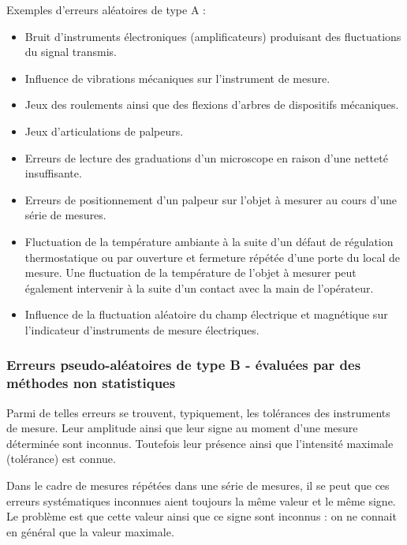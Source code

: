 Exemples d'erreurs aléatoires de type A :
\begin{itemize}

    \item Bruit d'instruments électroniques (amplificateurs) produisant des fluctuations du signal transmis.
    \item Influence de vibrations mécaniques sur l'instrument de mesure.
    \item Jeux des roulements ainsi que des flexions d'arbres de dispositifs mécaniques.
    \item Jeux d'articulations de palpeurs.
    \item Erreurs de lecture des graduations d'un microscope en raison d'une netteté insuffisante.
    \item Erreurs de positionnement d'un palpeur sur l'objet à mesurer au cours d'une série de mesures.
    \item Fluctuation de la température ambiante à la suite d'un défaut de régulation thermostatique ou par ouverture et fermeture répétée d'une porte du local de mesure. Une fluctuation de la température de l'objet à mesurer peut également intervenir à la suite d'un contact avec la main de l'opérateur.
    \item Influence de la fluctuation aléatoire du champ électrique et magnétique sur l'indicateur d'instruments de mesure électriques.
\end{itemize}

\subsubsection{Erreurs pseudo-aléatoires de type B - évaluées par des méthodes non statistiques}

Parmi de telles erreurs se trouvent, typiquement, les tolérances des instruments de mesure. Leur amplitude ainsi que leur signe au moment d'une mesure déterminée sont inconnus. Toutefois leur présence ainsi que l'intensité maximale (tolérance) est connue.

Dans le cadre de mesures répétées dans une série de mesures, il se peut que ces erreurs systématiques inconnues aient toujours la même valeur et le même signe.  Le problème est que cette valeur ainsi que ce signe sont inconnus : on ne connait en général que la valeur maximale.

